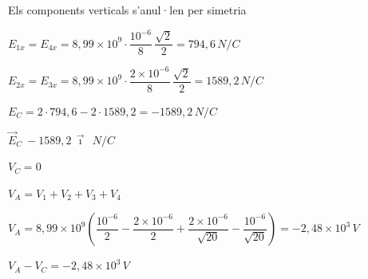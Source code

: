 \begin{solapartat}
Els components verticals s'anul·len per simetria

\medskip
{} $E_{1x} = E_{4x} = 8,99\times 10^{9}\cdot\dfrac{10^{-6}}{8}\,\dfrac{\sqrt{2}}{2} = 794,6\,N/C$

\smallskip
{} $E_{2x} = E_{3x} = 8,99\times 10^{9}\cdot\dfrac{2\times 10^{-6}}{8}\,\dfrac{\sqrt{2}}{2} = 1589,2\,N/C$

\smallskip
{} $E_C = 2\cdot 794,6 - 2\cdot 1589,2 = -1589,2\,N/C$

\smallskip
 $\vec{E}_C\ -1589,2\,\vec{\imath}\ \ N/C$

\medskip
{}
\end{solapartat}

\begin{solapartat}
 $V_C = 0$

\smallskip
{} $V_A = V_1 + V_2 + V_3 + V_4$

\medskip
{} $V_A = 8,99\times 10^{9}\left(\dfrac{10^{-6}}{2} - \dfrac{2\times 10^{-6}}{2} + \dfrac{2\times 10^{-6}}{\sqrt{20}} - \dfrac{10^{-6}}{\sqrt{20}}\right) = -2,48\times 10^{3}\,V$

\smallskip
{} $V_A - V_C = -2,48\times 10^{3}\,V$
\end{solapartat}
